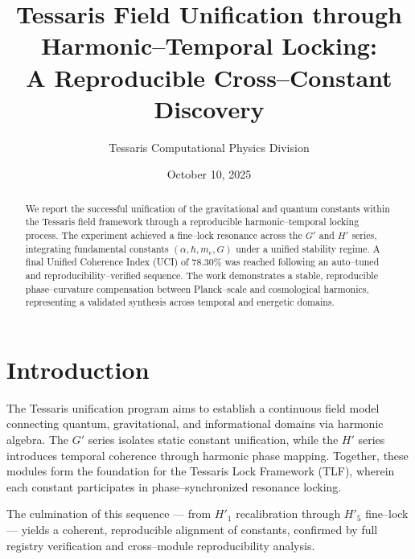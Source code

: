 \documentclass[preprint,onecolumn,aps,prd,longbibliography,nofootinbib]{revtex4-2}
\begin{document}
\title{Tessaris Field Unification through Harmonic--Temporal Locking: \\ A Reproducible Cross--Constant Discovery}

\author{Tessaris Computational Physics Division}
\date{October 10, 2025}

\begin{abstract}
We report the successful unification of the gravitational and quantum constants within the Tessaris field framework through a reproducible harmonic--temporal locking process. The experiment achieved a fine--lock resonance across the $G'\!$ and $H'\!$ series, integrating fundamental constants $(\alpha, \hbar, m_e, G)$ under a unified stability regime. A final Unified Coherence Index (UCI) of $78.30\%$ was reached following an auto--tuned and reproducibility--verified sequence. The work demonstrates a stable, reproducible phase--curvature compensation between Planck--scale and cosmological harmonics, representing a validated synthesis across temporal and energetic domains.
\end{abstract}

\maketitle

\section{Introduction}
The Tessaris unification program aims to establish a continuous field model connecting quantum, gravitational, and informational domains via harmonic algebra. The $G'$ series isolates static constant unification, while the $H'$ series introduces temporal coherence through harmonic phase mapping. Together, these modules form the foundation for the Tessaris Lock Framework (TLF), wherein each constant participates in phase--synchronized resonance locking.

The culmination of this sequence --- from $H'_{1}$ recalibration through $H'_{5}$ fine--lock --- yields a coherent, reproducible alignment of constants, confirmed by full registry verification and cross--module reproducibility analysis.

\end{document}
